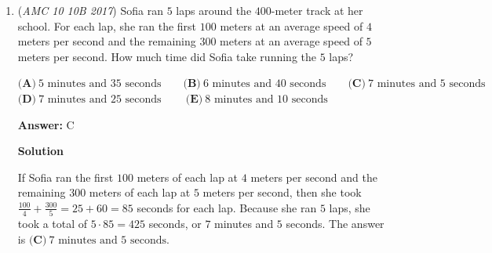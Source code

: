 \begin{enumerate}
You can just plug in the answer choices to see which one works. When you get to $12$, you multiply by $3$ and then add $11$ to get $47$. When you reverse the digits of $47$, you get $74$, which is within the given range. Thus, the answer is  $\boxed{\textbf{(B)}\ 12}$.

 



\textbf{Solution 4 (Fastest Way)}

Let x be the original number. The last digit of $3x+11$ must be $7$ so the last digit of $3x$ must be $6$. The only answer choice that satisfies this is $\boxed{\textbf{(B)}\ 12}$.

 



\textbf{Solution 5}

Subtract $11$ from the numbers $71$ through $75$. This yields $71-11 = 60$, $72-11 = 61$, $73-11 = 62$, $74-11 = 63$, and $75-11 = 64$. Of these, the only ones divisible by $3$ are $60$ and $63$. Therefore, the only possible values are $71$ and $74$. Switching the digits of each, we get $17$ and $47$. Subtracting $11$ from each, we get the numbers $6$ and $36$. Dividing each by $3$, we get $2$ and $12$. The only two-digit number is $12$, so the answer is $\boxed{\textbf{(B)}\ 12}$.

 


 


	\item (\textit{AMC 10 10B 2017}) Sofia ran $5$ laps around the $400$-meter track at her school. For each lap, she ran the first $100$ meters at an average speed of $4$ meters per second and the remaining $300$ meters at an average speed of $5$ meters per second. How much time did Sofia take running the $5$ laps?


 $\textbf{(A)}\ \text{5 minutes and 35 seconds}\qquad\textbf{(B)}\ \text{6 minutes and 40 seconds}\qquad\textbf{(C)}\ \text{7 minutes and 5 seconds}\qquad$
$\textbf{(D)}\ \text{7 minutes and 25 seconds}\ \qquad\textbf{(E)}\ \text{8 minutes and 10 seconds}$

 \textbf{Answer: }C



\textbf{Solution}

If Sofia ran the first $100$ meters of each lap at $4$ meters per second and the remaining $300$ meters of each lap at $5$ meters per second, then she took $\frac{100}{4}+\frac{300}{5}=25+60=85$ seconds for each lap. Because she ran $5$ laps, she took a total of $5 \cdot 85=425$ seconds, or $7$ minutes and $5$ seconds. The answer is $\boxed{\textbf{(C)}\ \text{7 minutes and 5 seconds}}$.


\end{enumerate}
